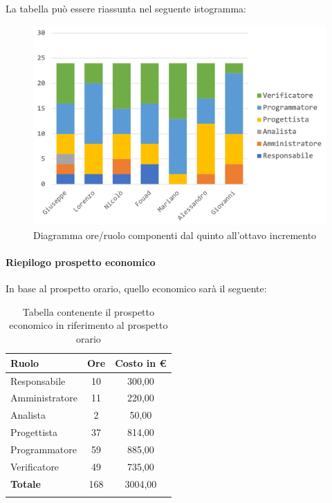 	La tabella può essere riassunta nel seguente istogramma:
	\begin{figure}[H]
		\centering
		\includegraphics[width=0.8\linewidth]{./images/preventivo/incremento5-8-1.png}
		\caption{Diagramma ore/ruolo componenti dal quinto all'ottavo incremento}
		\label{fig:diagramma suddivione ruoli incrementi V-VIII}
	\end{figure}
	\pagebreak
	
	\paragraph{Riepilogo prospetto economico}
	In base al prospetto orario, quello economico sarà il seguente: 
	
	\begin{longtable}{|l|c|c|}
		\hline
		\rowcolor{lighter-grayer}
		\textbf{Ruolo} & \textbf{Ore} & \textbf{Costo in € } \\
		\hline
		\endfirsthead
		
		\hline
		Responsabile 	    & 10 & 300,00\\
		\hline 
		\hline
		Amministratore	   & 11 & 220,00\\
		\hline
		\hline
		Analista 				& 2 & 50,00\\
		\hline
		\hline
		Progettista 		   & 37 & 814,00\\
		\hline
		\hline
		Programmatore 	  & 59 & 885,00\\
		\hline
		\hline
		Verificatore 		   & 49 & 735,00\\
		\hline
		\textbf{Totale} 	 & 168 & 3004,00\\
		\hline
		\caption{Tabella contenente il prospetto economico in riferimento al prospetto orario}
	\end{longtable}
	
